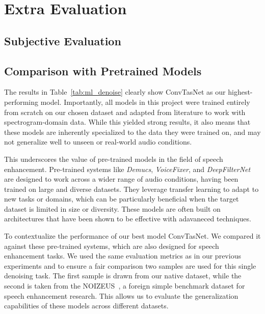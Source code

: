 \graphicspath{{content/appendices/figures}}
\chapter{Extra Evaluation}
\label{appendix:extra_evaluation}

\section{Subjective Evaluation}
\label{sec:subjective_evaluation}


\section{Comparison with Pretrained Models}
\label{sec:pretrained_comparison}

The results in Table~\ref{tab:ml_denoise} clearly show ConvTasNet as our highest-performing model. Importantly, all models in this project were trained entirely from scratch on our chosen dataset and adapted from literature to work with spectrogram-domain data. While this yielded strong results, it also means that these models are inherently specialized to the data they were trained on, and may not generalize well to unseen or real-world audio conditions.

This underscores the value of pre-trained models in the field of speech enhancement. Pre-trained systems like \textit{Demucs}, \textit{VoiceFixer}, and \textit{DeepFilterNet} are designed to work across a wider range of audio conditions, having been trained on large and diverse datasets. They leverage transfer learning to adapt to new tasks or domains, which can be particularly beneficial when the target dataset is limited in size or diversity. These models are often built on architectures that have been shown to be effective with adavaneced techniques.

To contextualize the performance of our best model ConvTasNet. We compared it against these pre-trained systems, which are also designed for speech enhancement tasks. We used the same evaluation metrics as in our previous experiments and to ensure a fair comparison two samples are used for this single denoising task. The first sample is drawn from our native dataset, while the second is taken from the NOIZEUS~\cite{hu2007subjective}, a foreign simple benchmark dataset for speech enhancement research. This allows us to evaluate the generalization capabilities of these models across different datasets.

